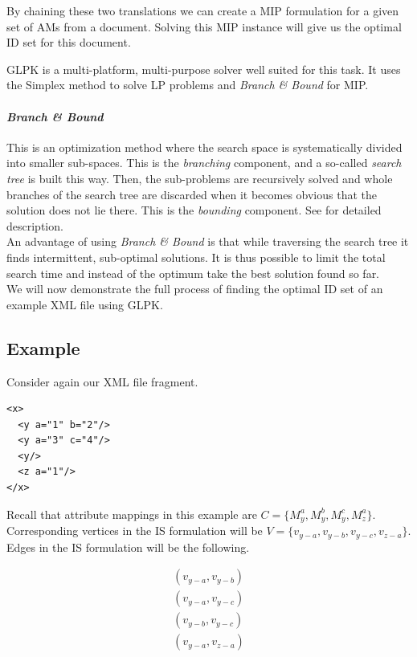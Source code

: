 By chaining these two translations we can create a MIP formulation for a given set of AMs from a document. Solving this MIP instance will give us the optimal ID set for this document.

GLPK is a multi-platform, multi-purpose solver well suited for this task. It uses the Simplex method to solve LP problems and \textit{Branch \& Bound} for MIP. 

\paragraph{\textit{Branch \& Bound}} This is an optimization method where the search space is systematically divided into smaller sub-spaces. This is the \textit{branching} component, and a so-called \textit{search tree} is built this way. Then, the sub-problems are recursively solved and whole branches of the search tree are discarded when it becomes obvious that the solution does not lie there. This is the \textit{bounding} component. See \cite{land60a} for detailed description.\\

An advantage of using \textit{Branch \& Bound} is that while traversing the search tree it finds intermittent, sub-optimal solutions. It is thus possible to limit the total search time and instead of the optimum take the best solution found so far.\\

We will now demonstrate the full process of finding the optimal ID set of an example XML file using GLPK.

\subsection*{Example}

Consider again our XML file fragment.

\begin{verbatim}
<x>
  <y a="1" b="2"/>
  <y a="3" c="4"/>
  <y/>
  <z a="1"/>
</x>
\end{verbatim}

Recall that attribute mappings in this example are $C = \{M_{y}^{a}, M_{y}^{b}, M_{y}^{c}, M_{z}^{a}\}$. Corresponding vertices in the IS formulation will be $V = \{v_{y-a}, v_{y-b}, v_{y-c}, v_{z-a}\}$. Edges in the IS formulation will be the following.

\begin{eqnarray*}
(v_{y-a},v_{y-b}) \\
(v_{y-a},v_{y-c}) \\
(v_{y-b},v_{y-c}) \\
(v_{y-a},v_{z-a}) \\
\end{eqnarray*}

